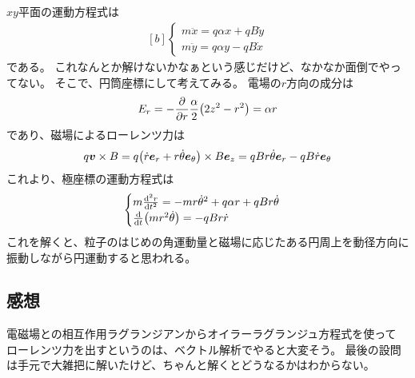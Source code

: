 \documentclass[../../master.tex]{subfiles}
\begin{document}
\subsection{}
\(xy\)平面の運動方程式は
\begin{equation}\begin{aligned}[b]
    \begin{cases}
        m\ddot{x} = q \alpha x + qB \dot{y}\\
        m\ddot{y} = q \alpha y - qB \dot{x}
    \end{cases}
\end{aligned}\end{equation}
である。
これなんとか解けないかなぁという感じだけど、なかなか面倒でやってない。
そこで、円筒座標にして考えてみる。
電場の\(r\)方向の成分は
\begin{equation}\begin{aligned}[b]
    E_r = -\pdv{r}\frac{\alpha}{2}\qty(2z^2-r^2) = \alpha r
\end{aligned}\end{equation}
であり、磁場によるローレンツ力は
\begin{equation}\begin{aligned}[b]
    q \vb*{v}\times B = q \qty(\dot{r}\vb*{e}_r + r\dot{\theta}\vb*{e}_\theta)\times B \vb*{e}_z
    = qBr\dot{\theta} \vb*{e}_r - qB\dot{r} \vb*{e}_{\theta}
\end{aligned}\end{equation}
これより、極座標の運動方程式は
\begin{equation}\begin{aligned}[b]
    \begin{cases}
        m\dv[2]{r}{t} = -mr\dot{\theta}^2 + q\alpha r + qB r\dot{\theta}\\
        \dv{t}\qty(mr^2\dot{\theta}) = -qBr\dot{r}
    \end{cases}
\end{aligned}\end{equation}
これを解くと、粒子のはじめの角運動量と磁場に応じたある円周上を動径方向に振動しながら円運動すると思われる。

\subsection*{感想}
電磁場との相互作用ラグランジアンからオイラーラグランジュ方程式を使って
ローレンツ力を出すというのは、ベクトル解析でやると大変そう。
最後の設問は手元で大雑把に解いたけど、ちゃんと解くとどうなるかはわからない。
\end{document}
